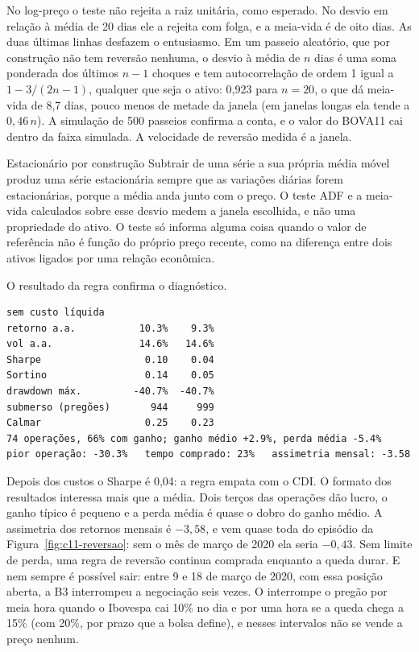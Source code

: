 No log-preço o teste não rejeita a raiz unitária, como esperado. No desvio em relação à média de 20 dias ele a rejeita com folga, e a meia-vida é de oito dias. As duas últimas linhas desfazem o entusiasmo. Em um passeio aleatório, que por construção não tem reversão nenhuma, o desvio à média de $n$ dias é uma soma ponderada dos últimos $n-1$ choques e tem autocorrelação de ordem 1 igual a $1 - 3/(2n-1)$, qualquer que seja o ativo: 0,923 para $n = 20$, o que dá meia-vida de 8,7 dias, pouco menos de metade da janela (em janelas longas ela tende a $0,46\,n$). A simulação de 500 passeios confirma a conta, e o valor do BOVA11 cai dentro da faixa simulada. A velocidade de reversão medida é a janela.

\begin{armadilha}{Estacionário por construção}
Subtrair de uma série a sua própria média móvel produz uma série estacionária sempre que as variações diárias forem estacionárias, porque a média anda junto com o preço. O teste ADF e a meia-vida calculados sobre esse desvio medem a janela escolhida, e não uma propriedade do ativo. O teste só informa alguma coisa quando o valor de referência não é função do próprio preço recente, como na diferença entre dois ativos ligados por uma relação econômica.
\end{armadilha}


O resultado da regra confirma o diagnóstico.

\begin{lstlisting}[style=saida]
                   sem custo líquida
retorno a.a.           10.3%    9.3%
vol a.a.               14.6%   14.6%
Sharpe                  0.10    0.04
Sortino                 0.14    0.05
drawdown máx.         -40.7%  -40.7%
submerso (pregões)       944     999
Calmar                  0.25    0.23
74 operações, 66% com ganho; ganho médio +2.9%, perda média -5.4%
pior operação: -30.3%   tempo comprado: 23%   assimetria mensal: -3.58
\end{lstlisting}

Depois dos custos o Sharpe é 0,04: a regra empata com o CDI. O formato dos resultados interessa mais que a média. Dois terços das operações dão lucro, o ganho típico é pequeno e a perda média é quase o dobro do ganho médio. A assimetria dos retornos mensais é $-3,58$, e vem quase toda do episódio da Figura~\ref{fig:c11-reversao}: sem o mês de março de 2020 ela seria $-0,43$. Sem limite de perda, uma regra de reversão continua comprada enquanto a queda durar. E nem sempre é possível sair: entre 9 e 18 de março de 2020, com essa posição aberta, a B3 interrompeu a negociação seis vezes. O  interrompe o pregão por meia hora quando o Ibovespa cai 10\% no dia e por uma hora se a queda chega a 15\% (com 20\%, por prazo que a bolsa define), e nesses intervalos não se vende a preço nenhum.


